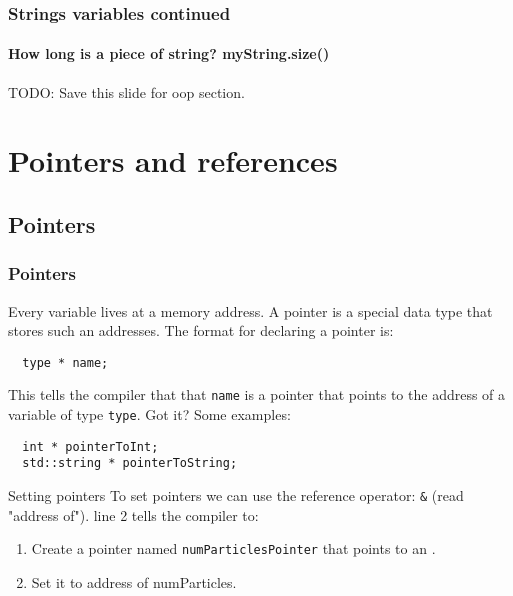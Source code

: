 \documentclass{beamer}
\begin{document}
\begin{frame}[fragile]
  \frametitle{Strings variables continued}
  \framesubtitle{How long is a piece of string? myString.size()}
  
  TODO: Save this slide for oop section.

\end{frame}

\section{Pointers and references}

\subsection{Pointers}

\begin{frame}[fragile]
  \frametitle{Pointers}
  Every variable lives at a memory address.  A pointer is a special data type that stores such an addresses.  The format for declaring a pointer is:
  \begin{lstlisting}
  type * name;
  \end{lstlisting}
  This tells the compiler that that \texttt{name} is a pointer that points to the address of a variable of type \texttt{type}.  Got it?
  \pause
  Some examples:
  \begin{lstlisting}
  int * pointerToInt;
  std::string * pointerToString;
  \end{lstlisting}
  \pause
  \begin{block}{Setting pointers}
	  To set pointers we can use the reference operator: \texttt{\&} (read "address of").
	  line 2 tells the compiler to:
	  \begin{enumerate}
	    \item{Create a pointer named \texttt{numParticlesPointer} that points to an .}
	    \pause
	    \item{Set it to address of numParticles.}
	  \end{enumerate}
  \end{block}
\end{frame}
\end{document}
